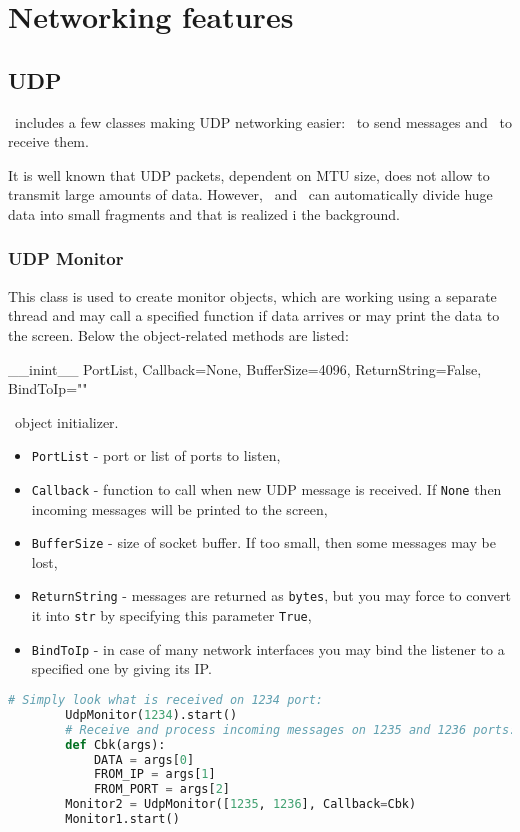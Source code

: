 \chapter{Networking features}

\section{UDP}

\ShellName\ includes a few classes making UDP networking easier: \UdpSender\ to send messages and \UdpMonitor\ to receive them. 

It is well known that UDP packets, dependent on MTU size, does not allow to transmit large amounts of data. However, \UdpSender\ and \UdpMonitor\ can automatically divide huge data into small fragments and that is realized i the background.

\subsection{UDP Monitor}

This class is used to create monitor objects, which are working using a separate thread and may call a specified function if data arrives or may print the data to the screen. Below the object-related methods are listed:

 {\_\_inint\_\_} {PortList, Callback=None, BufferSize=4096, ReturnString=False, BindToIp=""} {
	\UdpMonitor\ object initializer.
	\begin{itemize}
		\item \texttt{PortList} - port or list of ports to listen,
		\item \texttt{Callback} - function to call when new UDP message is received. If \texttt{None} then incoming messages will be printed to the screen,
		\item \texttt{BufferSize} - size of socket buffer. If too small, then some messages may be lost,
		\item \texttt{ReturnString} - messages are returned as \texttt{bytes}, but you may force to convert it into \texttt{str} by specifying this parameter \texttt{True},
		\item \texttt{BindToIp} - in case of many network interfaces you may bind the listener to a specified one by giving its IP. 
	\end{itemize}
}
\begin{lstlisting}[language=Python]
		# Simply look what is received on 1234 port:
		UdpMonitor(1234).start()
		# Receive and process incoming messages on 1235 and 1236 ports:
		def Cbk(args):
			DATA = args[0]
			FROM_IP = args[1]
			FROM_PORT = args[2]
		Monitor2 = UdpMonitor([1235, 1236], Callback=Cbk)
		Monitor1.start()
\end{lstlisting}

